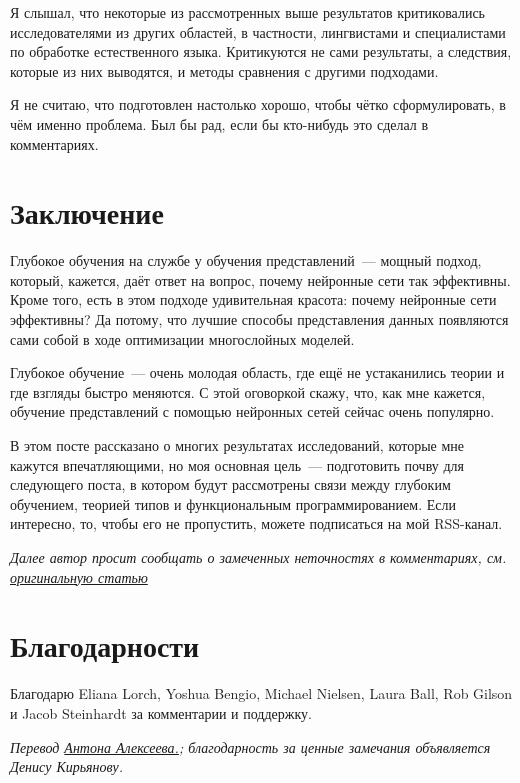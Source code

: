 \documentclass[a4paper,12pt]{article}
\begin{document}
Я слышал, что некоторые из рассмотренных выше результатов критиковались исследователями из других областей, в частности, лингвистами и специалистами по обработке естественного языка. Критикуются не сами результаты, а следствия, которые из них выводятся, и методы сравнения с другими подходами.

Я не считаю, что подготовлен настолько хорошо, чтобы чётко сформулировать, в чём именно проблема. Был бы рад, если бы кто-нибудь это сделал в комментариях.

\section*{Заключение}

Глубокое обучения на службе у обучения представлений~--- мощный подход, который, кажется, даёт ответ на вопрос, почему нейронные сети так эффективны. Кроме того, есть в этом подходе удивительная красота: почему нейронные сети эффективны? Да потому, что лучшие способы представления данных появляются сами собой в ходе оптимизации многослойных моделей.

Глубокое обучение~--- очень молодая область, где ещё не устаканились теории и где взгляды быстро меняются. С этой оговоркой скажу, что, как мне кажется, обучение представлений с помощью нейронных сетей сейчас очень популярно.

В этом посте рассказано о многих результатах исследований, которые мне кажутся впечатляющими, но моя основная цель~--- подготовить почву для следующего поста, в котором будут рассмотрены связи между глубоким обучением, теорией типов и функциональным программированием. Если интересно, то, чтобы его не пропустить, можете подписаться на мой RSS-канал.
 
{\it Далее автор просит сообщать о замеченных неточностях в комментариях, см. \href{http://colah.github.io/posts/2014-07-NLP-RNNs-Representations/}{оригинальную статью}} 
 
\section*{Благодарности}

Благодарю Eliana Lorch, Yoshua Bengio, Michael Nielsen, Laura Ball, Rob Gilson и Jacob Steinhardt за комментарии и поддержку.

\bigskip

{\it Перевод \href{http://www.stachek66.ru}{Антона Алексеева.}; благодарность за ценные замечания объявляется Денису Кирьянову.}

\end{document}
